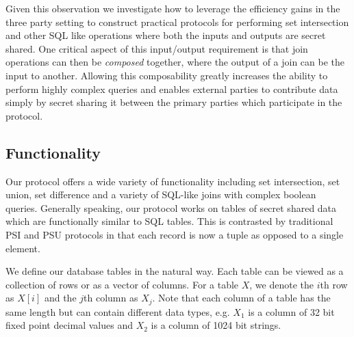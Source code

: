 Given this observation we investigate how to leverage the efficiency gains in the three party setting to construct practical protocols for performing set intersection and other SQL like operations where both the inputs and outputs are secret shared. One critical aspect of this input/output requirement is that join operations can then be \emph{composed} together, where the output of a join can be the input to another. Allowing this composability greatly increases the ability to perform highly complex queries and enables external parties to contribute data simply by secret sharing it between the primary parties which participate in the protocol.

\subsection{Functionality}

Our protocol offers a wide variety of functionality including set intersection, set union, set difference and a variety of SQL-like joins with complex boolean queries. Generally speaking, our protocol works on tables of secret shared data which are functionally similar to SQL tables. This is contrasted by traditional PSI and PSU protocols\cite{usenix:PSZ14,USENIX:PSSZ15,PSZ16,CCS:KKRT16} in that each record is now a tuple as opposed to a single element. 

We define our database tables in the natural way. Each table can be viewed as a collection of rows or as a vector of columns. For a table $X$, we denote the $i$th row as $X[i]$ and the $j$th column as $X_j$. 
\iffullversion
Note that each column of a table has the same length but can contain different data types, e.g. $X_1$ is a column of 32 bit fixed point decimal values and $X_2$ is a column of 1024 bit strings.

